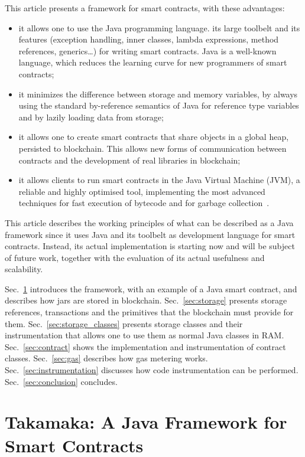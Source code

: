\documentclass[10pt]{llncs}
\begin{document}
This article presents a framework for smart contracts, with these advantages:
%
\begin{itemize}
\item it allows one to use the Java programming language. its
  large toolbelt and its features (exception handling, inner classes, lambda expressions,
  method references, generics\ldots) for writing
  smart contracts. Java is a well-known language, which reduces
  the learning curve for new programmers of smart contracts;
\item it minimizes the difference between storage and memory
  variables, by always using the standard by-reference semantics
  of Java for reference type variables and by lazily loading
  data from storage;
\item it allows one to create smart contracts that share objects
  in a global heap, persisted to blockchain. This allows
  new forms of communication between contracts and the
  development of real libraries in blockchain;
\item it allows clients to run smart contracts in the Java Virtual
  Machine (JVM), a reliable and highly optimised tool, implementing the most advanced
  techniques for fast execution of bytecode and for garbage
  collection~\cite{LindholmYBB14}.
\end{itemize}
%
This article describes the working principles of what can be described as a Java framework
since it uses Java and its toolbelt as development language for smart contracts.
Instead, its actual implementation
is starting now and will be subject of future work, together with the evaluation of its actual
usefulness and scalability.

Sec.~\ref{sec:takamaka} introduces
the framework, with an example of a Java smart contract,
and describes how jars are stored in blockchain.
Sec.~\ref{sec:storage} presents storage
references, transactions and the primitives that the blockchain must provide for them.
Sec.~\ref{sec:storage_classes} presents
storage classes and their instrumentation that allows one
to use them as normal Java classes in RAM. Sec.~\ref{sec:contract}
shows the implementation and instrumentation of contract classes.
Sec.~\ref{sec:gas} describes how gas metering works.
Sec.~\ref{sec:instrumentation} discusses how code instrumentation can be performed.
Sec.~\ref{sec:conclusion} concludes.

\section{Takamaka: A Java Framework for Smart Contracts}\label{sec:takamaka}
\end{document}

